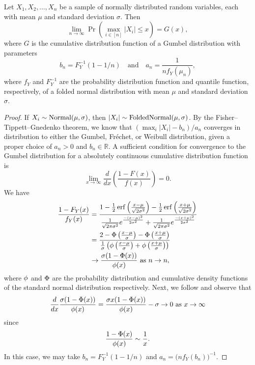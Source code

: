 \begin{theorem}
  \label{thm:maxabs-gev}
  Let \(X_1, X_2, \dots, X_n\) be a sample of normally distributed random variables, each with mean \(\mu\) and standard deviation \(\sigma\). Then
  \[
    \lim_{n \rightarrow \infty}\Pr\left(\max_{i \in [n]} |X_i| \leq x\right) = G(x),
  \]
  where \(G\) is the cumulative distribution function of a Gumbel distribution with
  parameters
  \[
    b_n = F_Y^{-1}(1 - 1/n)\quad \text{and} \quad a_n = \frac{1}{n f_Y(\mu_n)},
  \]
  where \(f_Y\) and \(F_Y^{-1}\) are the probability distribution function and quantile function, respectively, of a folded normal distribution with mean \(\mu\) and standard deviation \(\sigma\).
\end{theorem}
\begin{proof}
  If \(X_i \sim \operatorname{Normal}(\mu, \sigma)\), then \(|X_i| \sim \operatorname{FoldedNormal}(\mu,\sigma)\). By the Fisher--Tippett--Gnedenko theorem, we know that \((\max_i |X_i| - b_n) / a_n\) converges in distribution to either the Gumbel, Fréchet, or Weibull distribution, given a proper choice of \(a_n > 0\) and \(b_n \in \mathbb{R}\). A sufficient condition for convergence to the Gumbel distribution for a absolutely continuous cumulative distribution function~\parencite[Theorem 10.5.2]{nagaraja2003} is
  \[
    \lim_{x \rightarrow \infty} \frac{d}{dx}\left(\frac{1- F(x)}{f(x)}\right) = 0.
  \]
  We have
  \[
    \begin{aligned}
      \frac{1 - F_Y(x)}{f_Y(x)} & = \frac{1 - \frac{1}{2}\operatorname{erf}{\left(\frac{x - \mu}{\sqrt{2\sigma^2}}\right)} - \frac{1}{2}\operatorname{erf}{\left(\frac{x + \mu}{\sqrt{2\sigma^2}}\right)}}{\frac{1}{\sqrt{2\pi\sigma^2}}e^{\frac{-(x-\mu)^2}{2\sigma^2}} + \frac{1}{\sqrt{2\pi\sigma^2}}e^{\frac{-(x+\mu)^2}{2\sigma^2}}} \\
                                & = \frac{2 - \operatorname{\Phi}\left(\frac{x - \mu}{\sigma}\right) - \operatorname{\Phi}\left(\frac{x + \mu}{\sigma}\right)}{\frac{1}{\sigma}\left(\operatorname{\phi}\left(\frac{x - \mu}{\sigma}\right) + \operatorname{\phi}\left(\frac{x + \mu}{\sigma}\right)\right)}                                                              \\
                                & \rightarrow \frac{\sigma(1 - \operatorname{\Phi}(x))}{\operatorname{\phi}(x)} \text{ as } n \rightarrow n,
    \end{aligned}
  \]
  where \(\operatorname{\phi}\) and \(\operatorname{\Phi}\) are the probability distribution and cumulative density functions of the standard normal distribution respectively.
  Next, we follow \textcite[example 10.5.3]{nagaraja2003} and observe that
  \[
    \frac{d}{dx} \frac{\sigma(1 - \operatorname{\Phi}(x))}{\operatorname{\phi}(x)} = \frac{\sigma x (1 - \operatorname{\Phi}(x))}{\operatorname{\phi}(x)} - \sigma \rightarrow 0 \text{ as } x \rightarrow \infty
  \]
  since
  \[
    \frac{1 - \operatorname{\Phi}(x)}{\operatorname{\phi}(x)} \sim \frac{1}{x}.
  \]
  In this case, we may take \(b_n = F_Y^{-1}(1 - 1/n)\) and \(a_n = \big(n f_Y(b_n)\big)^{-1}\).
\end{proof}

